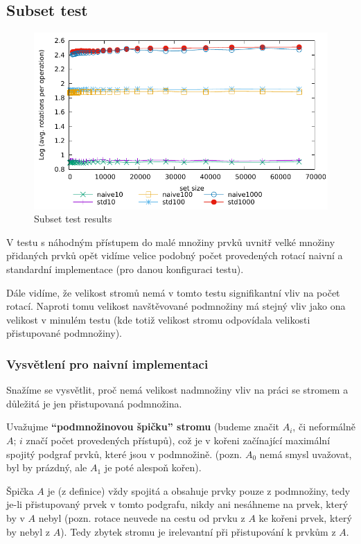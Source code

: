 \documentclass[a4paper,12pt]{article} %
\begin{document}
\pagebreak

\subsection*{Subset test}

\begin{figure}[!htb]
    \caption{Subset test results}
    \label{subset_results}
    \includegraphics{subset2d.pdf}    
\end{figure}

V testu s náhodným přístupem do malé množiny prvků uvnitř velké množiny přidaných prvků opět vidíme velice podobný počet provedených rotací naivní a standardní implementace (pro danou konfiguraci testu).

Dále vidíme, že velikost stromů nemá v tomto testu signifikantní vliv na počet rotací. Naproti tomu velikost navštěvované podmnožiny má stejný vliv jako ona velikost v minulém testu (kde totiž velikost stromu odpovídala velikosti přistupované podmnožiny).


\subsubsection*{Vysvětlení pro naivní implementaci}

Snažíme se vysvětlit, proč nemá velikost nadmnožiny vliv na práci se stromem a důležitá je jen přistupovaná podmnožina.

Uvažujme \textbf{``podmnožinovou špičku'' stromu} (budeme značit $A_i$, či neformálně $A$; $i$ značí počet provedených přístupů), což je v kořeni začínající maximální spojitý podgraf prvků, které jsou v podmnožině. (pozn. $A_0$ nemá smysl uvažovat, byl by prázdný, ale $A_1$ je poté alespoň kořen).

Špička $A$ je (z definice) vždy spojitá a obsahuje prvky pouze z podmnožiny, tedy je-li přistupovaný prvek v tomto podgrafu, nikdy ani nesáhneme na prvek, který by v $A$ nebyl (pozn. rotace neuvede na cestu od prvku z $A$ ke kořeni prvek, který by nebyl z $A$). Tedy zbytek stromu je irelevantní při přistupování k prvkům z $A$.
\end{document}
